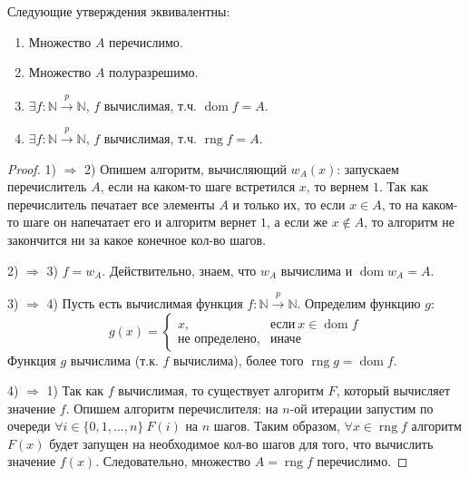 \begin{statement}
  Следующие утверждения эквивалентны:
  \begin{enumerate}
    \item Множество $A$ перечислимо.
    \item Множество $A$ полуразрешимо.
    \item $\exists f : \mathbb{N} \overset{p}{\to} \mathbb{N}$, $f$ вычислимая, т.ч. $\operatorname{dom} f = A$.
    \item $\exists f : \mathbb{N} \overset{p}{\to} \mathbb{N}$, $f$ вычислимая, т.ч. $\operatorname{rng} f = A$.
  \end{enumerate}
  \begin{proof}
    1) $\Rightarrow$ 2) \newline
    Опишем алгоритм, вычисляющий $w_A(x)$: запускаем перечислитель $A$, если на каком-то шаге встретился $x$, то вернем $1$. Так как перечислитель печатает все элементы $A$ и только их, то если $x \in A$, то на каком-то шаге он напечатает его и алгоритм вернет $1$, а если же $x \notin A$, то алгоритм не закончится ни за какое конечное кол-во шагов. \newline
    
    2) $\Rightarrow$ 3) \newline
    $f = w_A$. Действительно, знаем, что $w_A$ вычислима и $\operatorname{dom} w_A = A$. \newline

    3) $\Rightarrow$ 4) \newline
    Пусть есть вычислимая функция $f : \mathbb{N} \overset{p}{\to} \mathbb{N}$. Определим функцию $g$:
    \[
      g(x) = \begin{cases}
        x, & \textit{если} \> x \in \operatorname{dom} f \\
        \textit{не определено}, & \textit{иначе}
      \end{cases}
    \]
    Функция $g$ вычислима (т.к. $f$ вычислима), более того $\operatorname{rng} g = \operatorname{dom} f$. \newline

    4) $\Rightarrow$ 1) \newline
    Так как $f$ вычислимая, то существует алгоритм $F$, который вычисляет значение $f$. Опишем алгоритм перечислителя: на $n$-ой итерации запустим по очереди $\forall i \in \{0, 1, \dots, n\} \> F(i)$ на $n$ шагов. Таким образом, $\forall x \in \operatorname{rng} f$ алгоритм $F(x)$ будет запущен на необходимое кол-во шагов для того, что вычислить значение $f(x)$. Следовательно, множество $A = \operatorname{rng} f$ перечислимо.
  \end{proof}
\end{statement}
